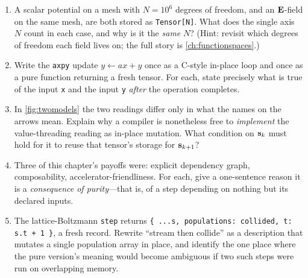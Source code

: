 \exercisessection
\begin{enumerate}[nosep]
  \item A scalar potential on a mesh with $N=10^6$ degrees of freedom, and an
  $\mathbf{E}$-field on the same mesh, are both stored as
  \lstinline[style=l4style]|Tensor[N]|. What does the single axis $N$ count in
  each case, and why is it the \emph{same} $N$? (Hint: revisit which degrees of
  freedom each field lives on; the full story is \cref{ch:functionspaces}.)
  \item Write the \texttt{axpy} update $y \leftarrow a x + y$ once as a C-style
  in-place loop and once as a pure function returning a fresh tensor. For each,
  state precisely what is true of the input \texttt{x} and the input \texttt{y}
  \emph{after} the operation completes.
  \item In \cref{fig:twomodels} the two readings differ only in what the names on
  the arrows mean. Explain why a compiler is nonetheless free to \emph{implement}
  the value-threading reading as in-place mutation. What condition on $\mathbf{s}_k$ must
  hold for it to reuse that tensor's storage for $\mathbf{s}_{k+1}$?
  \item Three of this chapter's payoffs were: explicit dependency graph,
  composability, accelerator-friendliness. For each, give a one-sentence reason it
  is a \emph{consequence of purity}---that is, of a step depending on nothing but
  its declared inputs.
  \item The lattice-Boltzmann \texttt{step} returns
  \lstinline[style=l4style]|{ ...s, populations: collided, t: s.t + 1 }|, a fresh
  record. Rewrite ``stream then collide'' as a description that mutates a single
  population array in place, and identify the one place where the pure version's
  meaning would become ambiguous if two such steps were run on overlapping memory.
\end{enumerate}
